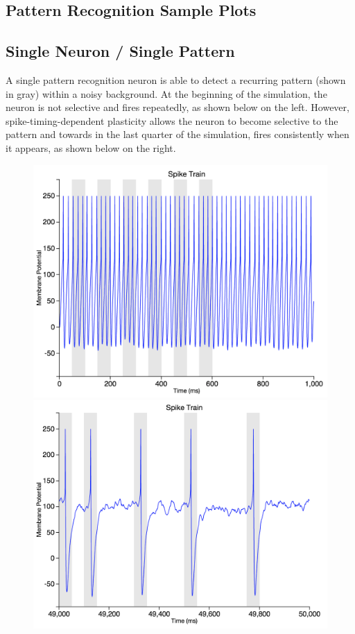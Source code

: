 \documentclass[a4paper,11pt]{article}
\begin{document}
\begin{appendices}
\section{Pattern Recognition Sample Plots}
\subsection{Single Neuron / Single Pattern}
A single pattern recognition neuron is able to detect a recurring pattern (shown in gray) within a noisy background. At the beginning of the simulation, the neuron is not selective and fires repeatedly, as shown below on the left. However, spike-timing-dependent plasticity allows the neuron to become selective to the pattern and towards in the last quarter of the simulation, fires consistently when it appears, as shown below on the right. \\

\begin{figure}[h]
\centering
\includegraphics[scale = 0.3]{single_pattern_beginning}
\includegraphics[scale = 0.3]{single_pattern_end} \\
\end{figure}


\end{appendices}
\end{document}
